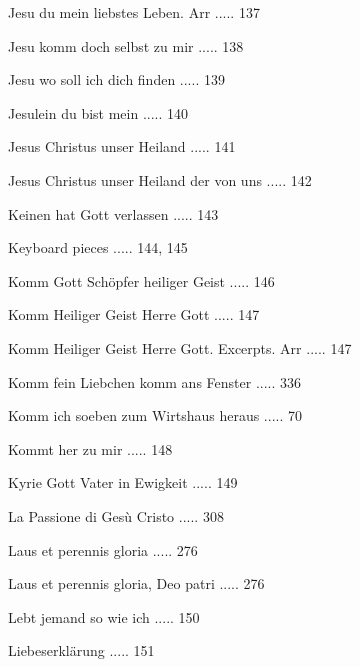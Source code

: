 \documentclass[twocolumn]{book}
\begin{document}
\newline 
Jesu du mein liebstes Leben. Arr ..... 137

\newline 
Jesu komm doch selbst zu mir ..... 138

\newline 
Jesu wo soll ich dich finden ..... 139

\newline 
Jesulein du bist mein ..... 140

\newline 
Jesus Christus unser Heiland ..... 141

\newline 
Jesus Christus unser Heiland der von uns ..... 142

\newline 
Keinen hat Gott verlassen ..... 143

\newline 
Keyboard pieces ..... 144, 145

\newline 
Komm Gott Schöpfer heiliger Geist ..... 146

\newline 
Komm Heiliger Geist Herre Gott ..... 147

\newline 
Komm Heiliger Geist Herre Gott. Excerpts. Arr ..... 147

\newline 
Komm fein Liebchen komm ans Fenster ..... 336

\newline 
Komm ich soeben zum Wirtshaus heraus ..... 70

\newline 
Kommt her zu mir ..... 148

\newline 
Kyrie Gott Vater in Ewigkeit ..... 149

\newline 
La Passione di Gesù Cristo ..... 308

\newline 
Laus et perennis gloria ..... 276

\newline 
Laus et perennis gloria, Deo patri ..... 276

\newline 
Lebt jemand so wie ich ..... 150

\newline 
Liebeserklärung ..... 151
\end{document}

